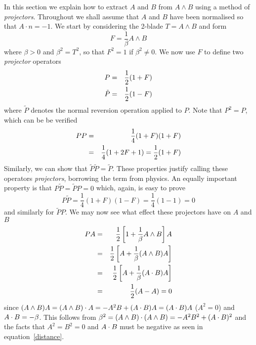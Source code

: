 In this section we explain how to extract $A$ and $B$ from
$A\wedge B$ using a method of \emph{projectors}. Throughout we shall assume
that $A$ and $B$ have been normalised so that $A\cdot n = -1$.
We start by considering the 2-blade $T = A\wedge B$ and form
%
\begin{equation}
  F = \frac{1}{\beta} A\wedge B
\end{equation}
%
where $\beta>0$ and ${\beta}^2 = T^2$, so that $F^2 = 1$
if $\beta^2 \ne 0$. We now use $F$ to define two
\emph{projector} operators
%
\begin{eqnarray}
   P & = & \frac{1}{2}(1+F) \nonumber \\
   \tilde{P} & = & \frac{1}{2}(1-F)
\end{eqnarray}
%
where $\tilde{P}$ denotes the normal reversion operation applied to
$P$. Note that $P^2 = P$, which can be be verified
%
\begin{eqnarray}
  PP & = & \frac{1}{4}(1+F)(1+F) \nonumber \\
     & = & \frac{1}{4}(1+2F + 1) = \frac{1}{2}(1+F)
\end{eqnarray}
%
Similarly, we can show that $\tilde{P}\tilde{P} =
\tilde{P}$. These properties justify calling these
operators \emph{projectors}, borrowing the term from physics. 
An equally important property is that $P\tilde{P}=\tilde{P}P = 0$
which, again, is easy to prove
%
\begin{equation}
   P\tilde{P} = \frac{1}{4}(1+F)(1-F)= \frac{1}{4}(1-1)=0
\end{equation}
%
and similarly for $\tilde{P}P$. We may now see what effect
these projectors have on $A$ and $B$
%
\begin{eqnarray}
 PA & = & \frac{1}{2}\left[1+\frac{1}{\beta}A\wedge
 B\right]A \nonumber \\
   & = & \frac{1}{2} \left[A + \frac{1}{\beta}(A\wedge
 B)A \right] \nonumber \\
  & = & \frac{1}{2}\left[ A + \frac{1}{\beta}(A\cdot
  B)A\right]
  \nonumber \\
  & = & \frac{1}{2} (A - A) = 0
\end{eqnarray}
%
since $(A\wedge B)A=(A\wedge B)\cdot A = -A^2B+(A\cdot B)A=(A\cdot
B)A$ ($A^2=0$) and  $A\cdot B = -\beta$. This follows
from $\beta^2 = (A\wedge B)\cdot (A\wedge B) = -A^2B^2 +
(A\cdot B)^2$ and the facts that $A^2 = B^2 = 0$ and $A\cdot
B$ must be negative as seen in equation~\ref{distance}.

